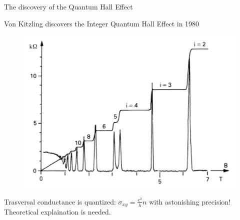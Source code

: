\documentclass{beamer}
\begin{document}
\begin{frame}{The discovery of the Quantum Hall Effect}
\begin{center}

Von Kitzling discovers the Integer Quantum Hall Effect in 1980

\begin{figure}[!htb]
\centering
\includegraphics[scale=.20]{integerQuantumHall.png}
\end{figure}

Trasversal conductance is quantized: $\sigma_{xy} = \frac{e^2}{h} n$ with astonishing precision! Theoretical explaination is needed.


\end{center}
\end{frame}


\end{document}
